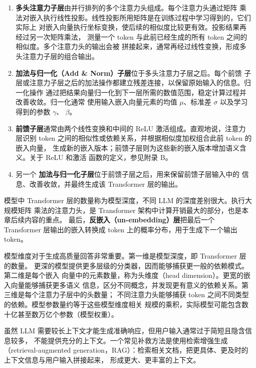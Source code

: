 \begin{enumerate}[label=\arabic*.,leftmargin=2.7em]
  \item \textbf{多头注意力子层}由并行排列的多个注意力头组成。每个注意力头通过矩阵
  乘法对嵌入执行线性投影。线性投影所用矩阵是在训练过程中学习得到的，它们实际上
  对嵌入向量执行坐标变换，使后续的相似度比较更有效。投影结果再经过另一次矩阵乘法，
  测量一个 token 与此前已经生成的所有 token 之间的相似度。多个注意力头的输出会被
  拼接起来，通常再经过线性变换，形成多头注意力子层的组合输出。

  \item \textbf{加法与归一化（Add \& Norm）子层}位于多头注意力子层之后。每个前馈
  子层或注意力子层之后的加法操作都建立残差连接，以保留原始输入的信息。归一化操作
  通过把结果向量归一化到下一层所需的数值范围，稳定计算过程并改善收敛。归一化通常
  使用输入嵌入向量元素的均值 $\mu$、标准差 $\sigma$ 以及学习得到的参数 $\gamma$、
  $\beta$。

  \item \textbf{前馈子层}通常由两个线性变换和中间的 ReLU 激活组成。直观地说，注意力
  层识别 token 之间的相似性或依赖关系，并根据相似度加权组合此前 token 的嵌入向量，
  生成新的嵌入版本；前馈子层则为这些新的嵌入版本增加语义含义。关于 ReLU 和激活
  函数的定义，参见附录 B。

  \item 另一个 \textbf{加法与归一化子层}位于前馈子层之后，用来保留前馈子层输入中的
  信息、改善收敛，并最终生成该 Transformer 层的输出。
\end{enumerate}

模型中 Transformer 层的数量称为模型深度，不同 LLM 的深度差别很大。执行大规模矩阵
乘法的注意力头，是 Transformer 架构中计算开销最大的部分，也是本章后续内容的重点。
最后，\textbf{反嵌入（un-embedding）层}把最后一个 Transformer 层输出的嵌入转换成
token 上的概率分布，用于生成下一个输出 token。

模型维度对于生成高质量回答非常重要。第一维是模型深度，即 Transformer 层的数量。
更深的模型提供更多层级的分类器，因而能够捕获更一般的依赖模式。第二维是每个嵌入
向量中的元素数量，称为头维度（head dimension）。更宽的嵌入向量能够捕获更多语义
信息，区分不同概念，并发现更有意义的依赖关系。第三维是每个注意力子层中的头数量；
不同注意力头能够捕获 token 之间不同类型的依赖。模型参数量约等于这些模型维度相关
规模的乘积，实际模型可能包含数十亿甚至数万亿个参数（模型权重）。

虽然 LLM 需要较长上下文才能生成准确响应，但用户输入通常过于简短且隐含信息较多，
不能提供充分的上下文。一个常见补救方法是使用检索增强生成（retrieval-augmented
generation，RAG）：检索相关文档，把更具体、更及时的上下文信息与用户输入拼接起来，
形成更大、更丰富的上下文。

